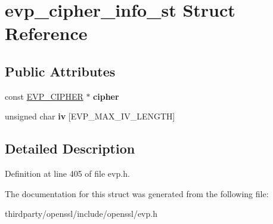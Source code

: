 \hypertarget{structevp__cipher__info__st}{}\section{evp\+\_\+cipher\+\_\+info\+\_\+st Struct Reference}
\label{structevp__cipher__info__st}
\subsection*{Public Attributes}
\begin{DoxyCompactItemize}
\item 
\mbox{\label{structevp__cipher__info__st_a54d5bc0202fbebadb925e7e87e7ee544}} 
const \hyperlink{structevp__cipher__st}{E\+V\+P\+\_\+\+C\+I\+P\+H\+ER} $\ast$ {\bfseries cipher}
\item 
\mbox{\label{structevp__cipher__info__st_a579960a9fa646b1f82ecf67293c8a819}} 
unsigned char {\bfseries iv} \mbox{[}E\+V\+P\+\_\+\+M\+A\+X\+\_\+\+I\+V\+\_\+\+L\+E\+N\+G\+TH\mbox{]}
\end{DoxyCompactItemize}


\subsection{Detailed Description}


Definition at line 405 of file evp.\+h.



The documentation for this struct was generated from the following file\+:\begin{DoxyCompactItemize}
\item 
thirdparty/openssl/include/openssl/evp.\+h\end{DoxyCompactItemize}
